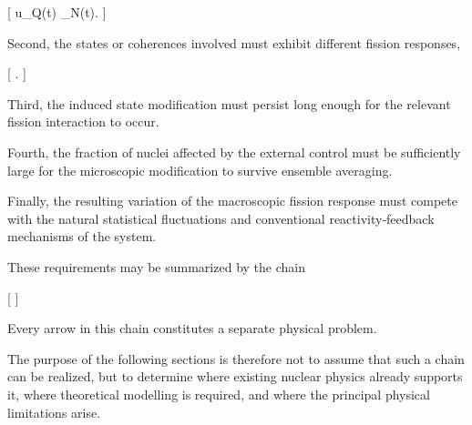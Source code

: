 [
u_Q(t)
\rightarrow
\delta\rho_N(t).
]

Second, the states or coherences involved must exhibit different fission responses,

[
.
]

Third, the induced state modification must persist long enough for the relevant fission interaction to occur.

Fourth, the fraction of nuclei affected by the external control must be sufficiently large for the microscopic modification to survive ensemble averaging.

Finally, the resulting variation of the macroscopic fission response must compete with the natural statistical fluctuations and conventional reactivity-feedback mechanisms of the system.

These requirements may be summarized by the chain

[
]

Every arrow in this chain constitutes a separate physical problem.

The purpose of the following sections is therefore not to assume that such a chain can be realized, but to determine where existing nuclear physics already supports it, where theoretical modelling is required, and where the principal physical limitations arise.

